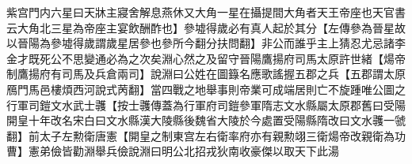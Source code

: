紫宫門内六星曰天牀主寢舍解息燕休又大角一星在攝提間大角者天王帝座也天官書云大角北三星為帝座主宴飲酬酢也】參墟得歲必有真人起於其分【左傳參為晉星故以晉陽為參墟得歲謂歲星居參也參所今翻分扶問翻】非公而誰乎主上猜忍尤忌諸李金才既死公不思變通必為之次矣淵心然之及留守晉陽鷹揚府司馬太原許世緒【煬帝制鷹揚府有司馬及兵倉兩司】說淵曰公姓在圖籙名應歌謠握五郡之兵【五郡謂太原鴈門馬邑樓煩西河說式苪翻】當四戰之地舉事則帝業可成端居則亡不旋踵唯公圖之行軍司鎧文水武士彠【按士彠傳蓋為行軍府司鎧參軍隋志文水縣屬太原郡舊曰受陽開皇十年改名宋白曰文水縣漢大陵縣後魏省大陵於今處置受陽縣隋改曰文水彠一虢翻】前太子左勲衛唐憲【開皇之制東宫左右衛率府亦有親勲翊三衛煬帝改親衛為功曹】憲弟儉皆勸淵舉兵儉說淵曰明公北招戎狄南收豪傑以取天下此湯